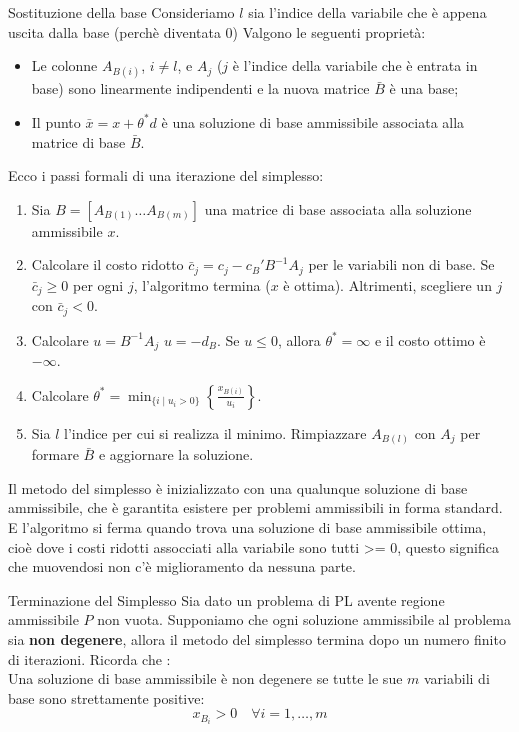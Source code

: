\begin{theorem}{Sostituzione della base}
Consideriamo $l$ sia l'indice della variabile che è appena uscita dalla base (perchè diventata 0)
Valgono le seguenti proprietà:
\begin{itemize}
\item[(a)] Le colonne $A_{B(i)}$, $i \neq l$, e $A_j$ ($j$ è l'indice della variabile che è entrata in base) sono linearmente indipendenti e la nuova matrice $\bar{B}$ è una base;
\item[(b)] Il punto $\bar{x} = x + \theta^* d$ è una soluzione di base ammissibile associata alla matrice di base $\bar{B}$.
\end{itemize}
\end{theorem}

Ecco i passi formali di una iterazione del simplesso:
\begin{enumerate}
\item Sia $B = [A_{B(1)} \dots A_{B(m)}]$ una matrice di base associata alla soluzione ammissibile $x$.
\item Calcolare il costo ridotto $\bar{c}_j = c_j - c_B' B^{-1} A_j$ per le variabili non di base. Se $\bar{c}_j \ge 0$ per ogni $j$, l'algoritmo termina ($x$ è ottima). Altrimenti, scegliere un $j$ con $\bar{c}_j < 0$.
\item Calcolare $u = B^{-1} A_j$ $u = -d_B$. Se $u \le 0$, allora $\theta^* = \infty$ e il costo ottimo è $-\infty$.
\item Calcolare $\theta^* = \min_{\{i \mid u_i > 0\}} \left\{ \frac{x_{B(i)}}{u_i} \right\}$.
\item Sia $l$ l'indice per cui si realizza il minimo. Rimpiazzare $A_{B(l)}$ con $A_j$ per formare $\bar{B}$ e aggiornare la soluzione.
\end{enumerate}
Il metodo del simplesso è inizializzato con una qualunque soluzione di base
ammissibile, che è garantita esistere per problemi ammissibili in forma standard.
E l'algoritmo si ferma quando trova una soluzione di base ammissibile ottima, cioè dove i costi ridotti assocciati alla variabile sono tutti >= 0, questo significa che muovendosi non c'è miglioramento da nessuna parte.


\newpage

\begin{theorem}{Terminazione del Simplesso}
Sia dato un problema di PL avente regione ammissibile $P$ non vuota. Supponiamo che ogni soluzione ammissibile al problema sia \textbf{non degenere}, allora il metodo del simplesso termina dopo un numero finito di iterazioni.
Ricorda che : \\ 
Una soluzione di base ammissibile è non degenere se tutte le sue \(m\) variabili di base sono strettamente positive:
\[
\boxed{x_{B_i}>0 \quad \forall i=1,\ldots,m}
\]
\end{theorem}

